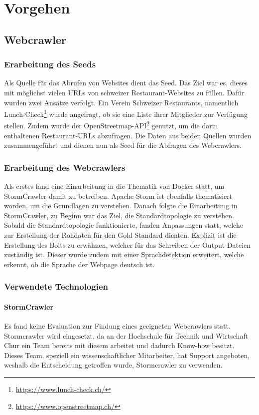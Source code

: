 \chapter{Vorgehen}
\section{Webcrawler}
\subsection{Erarbeitung des Seeds}
Als Quelle für das Abrufen von Websites dient das Seed.
Das Ziel war es, dieses mit möglichst vielen URLs von schweizer Restaurant-Websites zu füllen.
Dafür wurden zwei Ansätze verfolgt.
Ein Verein Schweizer Restaurants, namentlich Lunch-Check\footnote{\url{https://www.lunch-check.ch/}} wurde angefragt, ob sie eine Liste ihrer Mitglieder zur Verfügung stellen.
Zudem wurde der OpenStreetmap-API\footnote{\url{https://www.openstreetmap.ch/}} genutzt, um die darin enthaltenen Restaurant-URLs abzufragen.
Die Daten aus beiden Quellen wurden zusammengeführt und dienen nun als Seed für die Abfragen des Webcrawlers.
\subsection{Erarbeitung des Webcrawlers}
Als erstes fand eine Einarbeitung in die Thematik von Docker statt, um StormCrawler damit zu betreiben.
Apache Storm ist ebenfalls thematisiert worden, um die Grundlagen zu verstehen.
Danach folgte die Einarbeitung in StormCrawler, zu Beginn war das Ziel, die Standardtopologie zu verstehen.
Sobald die Standardtopologie funktionierte, fanden Anpassungen statt, welche zur Erstellung der Rohdaten für den Gold Standard dienten.
Explizit ist die Erstellung des Bolts zu erwähnen, welcher für das Schreiben der Output-Dateien zuständig ist.
Dieser wurde zudem mit einer Sprachdetektion erweitert, welche erkennt, ob die Sprache der Webpage deutsch ist.
\subsection{Verwendete Technologien}
\subsubsection{StormCrawler}
Es fand keine Evaluation zur Findung eines geeigneten Webcrawlers statt.
Stormcrawler wird eingesetzt, da an der Hochschule für Technik und Wirtschaft Chur ein Team bereits mit diesem arbeitet und dadurch Know-how besitzt.
Dieses Team, speziell ein wissenschaftlicher Mitarbeiter, hat Support angeboten, weshalb die Entscheidung getroffen wurde, Stormcrawler zu verwenden.
